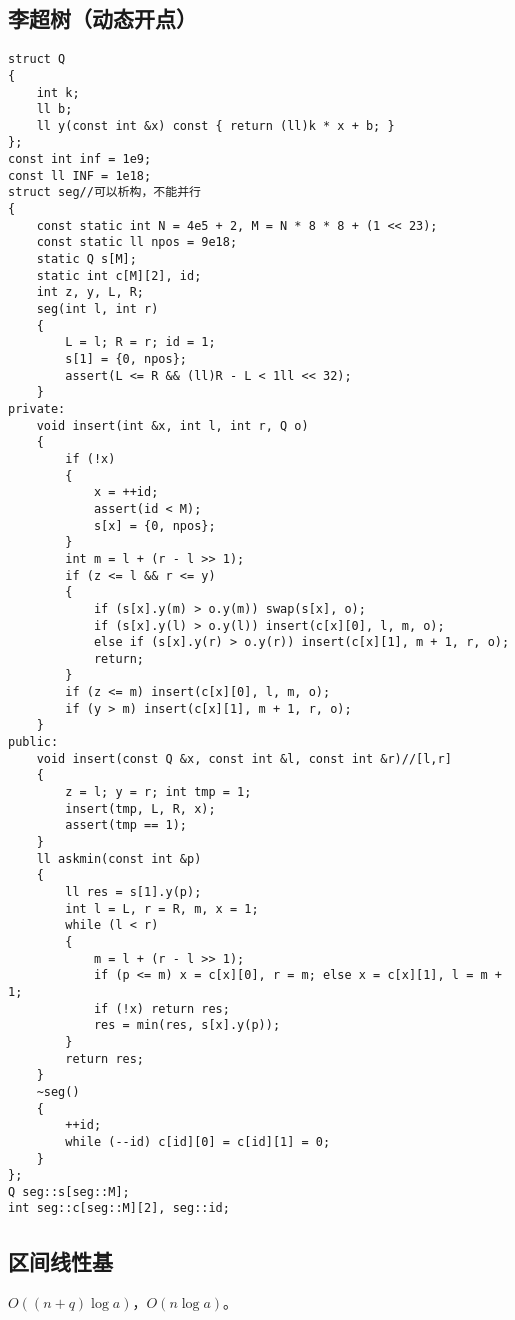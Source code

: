 \documentclass[12pt]{ctexart}
\begin{document}
\subsection{李超树（动态开点）}
\begin{lstlisting}
struct Q
{
	int k;
	ll b;
	ll y(const int &x) const { return (ll)k * x + b; }
};
const int inf = 1e9;
const ll INF = 1e18;
struct seg//可以析构，不能并行
{
	const static int N = 4e5 + 2, M = N * 8 * 8 + (1 << 23);
	const static ll npos = 9e18;
	static Q s[M];
	static int c[M][2], id;
	int z, y, L, R;
	seg(int l, int r)
	{
		L = l; R = r; id = 1;
		s[1] = {0, npos};
		assert(L <= R && (ll)R - L < 1ll << 32);
	}
private:
	void insert(int &x, int l, int r, Q o)
	{
		if (!x)
		{
			x = ++id;
			assert(id < M);
			s[x] = {0, npos};
		}
		int m = l + (r - l >> 1);
		if (z <= l && r <= y)
		{
			if (s[x].y(m) > o.y(m)) swap(s[x], o);
			if (s[x].y(l) > o.y(l)) insert(c[x][0], l, m, o);
			else if (s[x].y(r) > o.y(r)) insert(c[x][1], m + 1, r, o);
			return;
		}
		if (z <= m) insert(c[x][0], l, m, o);
		if (y > m) insert(c[x][1], m + 1, r, o);
	}
public:
	void insert(const Q &x, const int &l, const int &r)//[l,r]
	{
		z = l; y = r; int tmp = 1;
		insert(tmp, L, R, x);
		assert(tmp == 1);
	}
	ll askmin(const int &p)
	{
		ll res = s[1].y(p);
		int l = L, r = R, m, x = 1;
		while (l < r)
		{
			m = l + (r - l >> 1);
			if (p <= m) x = c[x][0], r = m; else x = c[x][1], l = m + 1;
			if (!x) return res;
			res = min(res, s[x].y(p));
		}
		return res;
	}
	~seg()
	{
		++id;
		while (--id) c[id][0] = c[id][1] = 0;
	}
};
Q seg::s[seg::M];
int seg::c[seg::M][2], seg::id;

\end{lstlisting}


\subsection{区间线性基}

$O((n+q)\log a)$，$O(n\log a)$。
\end{document}
